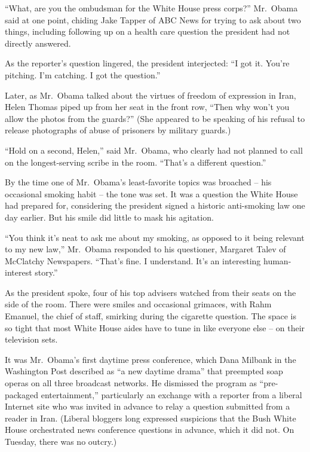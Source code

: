 ﻿\documentclass[12pt]{article}
\begin{document}
``What, are you the ombudsman for the White House press corps?'' Mr.~Obama said at one point,
chiding Jake Tapper of ABC News for trying to ask about two things, including following up on a
health care question the president had not directly answered.

As the reporter's question lingered, the president interjected: ``I got it. You're pitching. I'm
catching. I got the question.''

Later, as Mr.~Obama talked about the virtues of freedom of expression in Iran, Helen Thomas piped up
from her seat in the front row, ``Then why won't you allow the photos from the guards?'' (She
appeared to be speaking of his refusal to release photographs of abuse of prisoners by military
guards.)

``Hold on a second, Helen,'' said Mr.~Obama, who clearly had not planned to call on the
longest-serving scribe in the room. ``That's a different question.''

By the time one of Mr.~Obama's least-favorite topics was broached -- his occasional smoking habit --
the tone was set. It was a question the White House had prepared for, considering the president
signed a historic anti-smoking law one day earlier. But his smile did little to mask his agitation.

``You think it's neat to ask me about my smoking, as opposed to it being relevant to my new law,''
Mr.~Obama responded to his questioner, Margaret Talev of McClatchy Newspapers. ``That's fine. I
understand. It's an interesting human-interest story.''

As the president spoke, four of his top advisers watched from their seats on the side of the room.
There were smiles and occasional grimaces, with Rahm Emanuel, the chief of staff, smirking during
the cigarette question. The space is so tight that most White House aides have to tune in like
everyone else -- on their television sets.

It was Mr.~Obama's first daytime press conference, which Dana Milbank in the Washington Post
described as ``a new daytime drama'' that preempted soap operas on all three broadcast networks. He
dismissed the program as ``pre-packaged entertainment,'' particularly an exchange with a reporter
from a liberal Internet site who was invited in advance to relay a question submitted from a reader
in Iran. (Liberal bloggers long expressed suspicions that the Bush White House orchestrated news
conference questions in advance, which it did not. On Tuesday, there was no outcry.)
\end{document}
